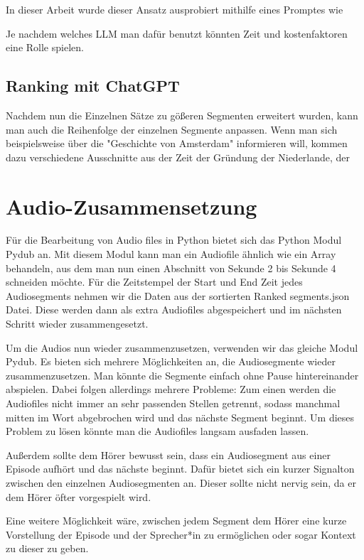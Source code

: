 In dieser Arbeit wurde dieser Ansatz ausprobiert mithilfe eines Promptes wie 

Je nachdem welches LLM man dafür benutzt könnten Zeit und kostenfaktoren eine Rolle spielen.


\subsection{Ranking mit ChatGPT}

Nachdem nun die Einzelnen Sätze zu gößeren Segmenten erweitert wurden, kann man auch die Reihenfolge der einzelnen Segmente anpassen.
Wenn man sich beispielsweise über die "Geschichte von Amsterdam" informieren will, kommen dazu verschiedene Ausschnitte aus der Zeit der Gründung der Niederlande, der 



\section{Audio-Zusammensetzung}


Für die Bearbeitung von Audio files in Python bietet sich das Python Modul Pydub an. Mit diesem Modul kann man ein Audiofile ähnlich wie ein Array behandeln, aus dem man nun einen Abschnitt von Sekunde 2 bis Sekunde 4 schneiden möchte. 
Für die Zeitstempel der Start und End Zeit jedes Audiosegments nehmen wir die Daten aus der sortierten Ranked segments.json Datei.
Diese werden dann als extra Audiofiles abgespeichert und im nächsten Schritt wieder zusammengesetzt.

Um die Audios nun wieder zusammenzusetzen, verwenden wir das gleiche Modul Pydub. 
Es bieten sich mehrere Möglichkeiten an, die Audiosegmente wieder zusammenzusetzen. 
Man könnte die Segmente einfach ohne Pause hintereinander abspielen. Dabei folgen allerdings mehrere Probleme: 
Zum einen werden die Audiofiles nicht immer an sehr passenden Stellen getrennt, sodass manchmal mitten im Wort abgebrochen wird und das nächste Segment beginnt. 
Um dieses Problem zu lösen könnte man die Audiofiles langsam ausfaden lassen.

Außerdem sollte dem Hörer bewusst sein, dass ein Audiosegment aus einer Episode aufhört und das nächste beginnt. 
Dafür bietet sich ein kurzer Signalton zwischen den einzelnen Audiosegmenten an. 
Dieser sollte nicht nervig sein, da er dem Hörer öfter vorgespielt wird. 

Eine weitere Möglichkeit wäre, zwischen jedem Segment dem Hörer eine kurze Vorstellung der Episode und der Sprecher*in zu ermöglichen oder sogar Kontext zu dieser zu geben. 

